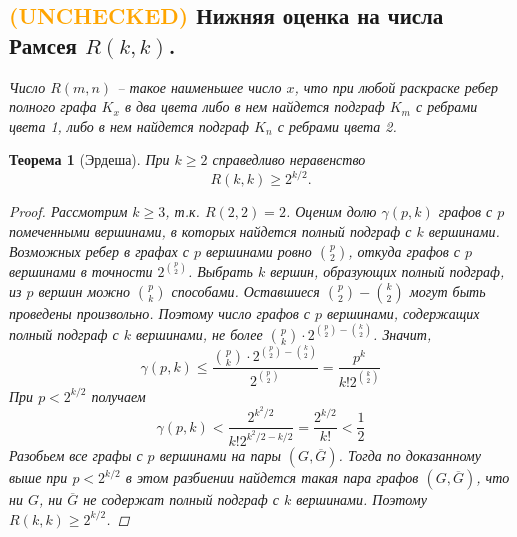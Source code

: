\documentclass{article}
\newtheorem{theorem}{Теорема}
\begin{document}
\subsection{\textcolor{orange}{(UNCHECKED)} Нижняя оценка на числа Рамсея $R(k, k)$.}
\textit{Число $R(m,n)$ -- такое наименьшее число $x$, что при любой раскраске ребер полного графа $K_x$ в два цвета либо в нем найдется подграф $K_m$ с ребрами цвета 1,
либо в нем найдется подграф $K_n$ с ребрами цвета 2.}
\begin{theorem}[Эрдеша]
При $k \geqslant 2$ справедливо неравенство
\[
R(k,k) \geqslant 2^{k/2}.
\]
\begin{proof}
Рассмотрим $k \geqslant 3$, т.к. $R(2,2) = 2$. Оценим долю $\gamma (p,k)$ графов с $p$ помеченными вершинами, в которых найдется полный подграф с $k$ вершинами.
Возможных ребер в графах с $p$ вершинами ровно $\binom{p}{2}$, откуда графов с $p$ вершинами в точности $2^{\binom{p}{2}}$.
Выбрать $k$ вершин, образующих полный подграф, из $p$ вершин можно $\binom{p}{k}$ способами. Оставшиеся $\binom{p}{2} - \binom{k}{2}$ могут быть проведены произвольно. Поэтому число графов с $p$ вершинами, содержащих полный подграф с $k$ вершинами, не более $\binom{p}{k} \cdot 2^{\binom{p}{2} - \binom{k}{2}}$. Значит,
\[
\gamma(p,k) \leqslant \frac{\binom{p}{k} \cdot 2^{\binom{p}{2} - \binom{k}{2}}}{2^{\binom{p}{2}}} = \frac{p^k}{k!2^{\binom{k}{2}}}
\]
При $p < 2^{k/2}$ получаем
\[
\gamma (p,k) < \frac{2^{k^2/2}}{k! 2^{k^2/2 - k/2}} =
\frac{2^{k/2}}{k!} < \frac{1}{2}
\]
Разобьем все графы с $p$ вершинами на пары $(G, \overline{G})$.
Тогда по доказанному выше при $p < 2^{k/2}$ в этом разбиении найдется такая пара графов $(G, \overline{G})$, что ни $G$, ни $\overline{G}$ не содержат полный подграф с $k$ вершинами.
Поэтому $R(k,k) \geqslant 2^{k/2}$.
\end{proof}
\end{theorem}
\end{document}
